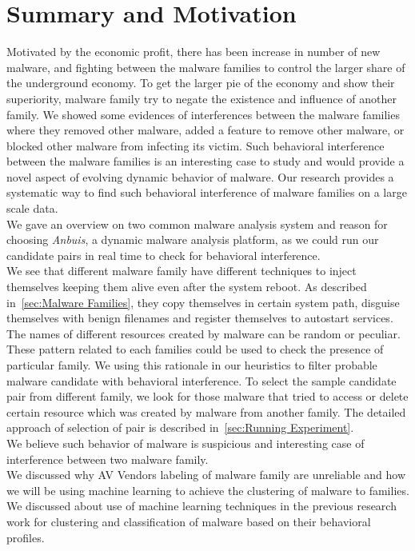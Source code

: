 \section{Summary and Motivation}
\label{sec:Motivation}
Motivated by the economic profit, there has been increase in number of new malware, and fighting between the malware families to control the larger share of the underground economy.
To get the larger pie of the economy and show their superiority, malware family try to negate the existence and influence of another family.
We showed some evidences of interferences between the malware families where they removed other malware, added a feature to remove other malware, or blocked other malware from infecting its victim.
Such behavioral interference between the malware families is an interesting case to study and would provide a novel aspect of evolving dynamic behavior of malware.
Our research provides a systematic way to find such behavioral interference of malware families on a large scale data.
\\
We gave an overview on two common malware analysis system and reason for choosing \emph{Anbuis}, a dynamic malware analysis platform, as we could run our candidate pairs in real time to check for behavioral interference.\\
We see that different malware family have different techniques to inject themselves keeping them alive even after the system reboot.
As described in~\autoref{sec:Malware Families}, they copy themselves in certain system path, disguise themselves with benign filenames and register themselves to autostart services.
The names of different resources created by malware can be random or peculiar.
These pattern related to each families could be used to check the presence of particular family.
We using this rationale in our heuristics to filter probable malware candidate with behavioral interference.
To select the sample candidate pair from different family, we look for those malware that tried to access or delete certain resource which was created by malware from another family.
The detailed approach of selection of pair is described in~\autoref{sec:Running Experiment}.\\
We believe such behavior of malware is suspicious and interesting case of interference between two malware family.\\
We discussed why AV Vendors labeling of malware family are unreliable and how we will be using machine learning to achieve the clustering of malware to families.
We discussed about use of machine learning techniques in the previous research work for clustering and classification of malware based on their behavioral profiles.
